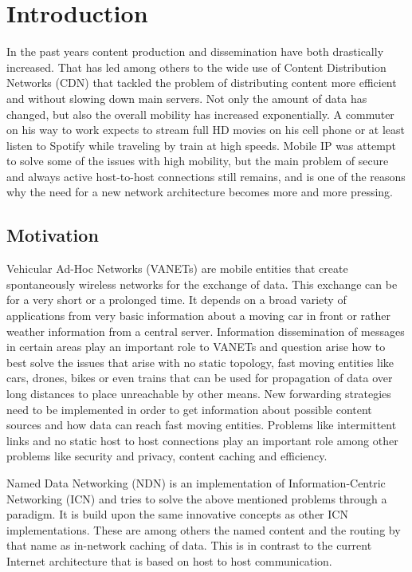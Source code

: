 \chapter{Introduction}

In the past years content production and dissemination have both drastically increased. That has led among others to the wide use of Content Distribution Networks (CDN) that tackled the problem of distributing content more efficient and without slowing down main servers. Not only the amount of data has changed, but also the overall mobility has increased exponentially. A commuter on his way to work expects to stream full HD movies on his cell phone or at least listen to Spotify while traveling by train at high speeds. Mobile IP was attempt to solve some of the issues with high mobility, but the main problem of secure and always active host-to-host connections still remains, and is one of the reasons why the need for a new network architecture becomes more and more pressing.

\section{Motivation}

Vehicular Ad-Hoc Networks (VANETs) are mobile entities that create spontaneously wireless networks for the exchange of data. This exchange can be for a very short or a prolonged time. It depends on a broad variety of applications from very basic information about a moving car in front or rather weather information from a central server. Information dissemination of messages in certain areas play an important role to VANETs and question arise how to best solve the issues that arise with no static topology, fast moving entities like cars, drones, bikes or even trains that can be used for propagation of data over long distances to place unreachable by other means. New forwarding strategies need to be implemented in order to get information about possible content sources and how data can reach fast moving entities. Problems like intermittent links and no static host to host connections play an important role among other problems like security and privacy, content caching and efficiency.

Named Data Networking (NDN) is an implementation of Information-Centric Networking (ICN) and tries to solve the above mentioned problems through a paradigm. It is build upon the same innovative concepts as other ICN implementations. These are among others the named content and the routing by that name as in-network caching of data. This is in contrast to the current Internet architecture that is based on host to host communication. 

